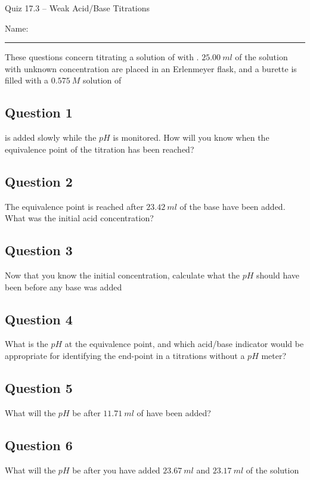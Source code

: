 \documentclass[11pt, letterpaper]{memoir}
\begin{document}
	\begin{center}
		{\large	Quiz 17.3 -- Weak Acid/Base Titrations}
	\end{center}
	{\large Name: \rule[-1mm]{4in}{.1pt} 

	\noindent These questions concern titrating a solution of  with . $25.00~ml$ of the  solution with unknown concentration are placed in an Erlenmeyer flask, and a burette is filled with a $0.575~M$ solution of 
	\subsection*{Question 1}
	 is added slowly while the $pH$ is monitored. How will you know when the equivalence point of the titration has been reached?
	
	\vspace{1em}
	\subsection*{Question 2}
	The equivalence point is reached after $23.42~ml$ of the base have been added. \\What was the initial acid concentration?
	
	\vspace{2em}
	\subsection*{Question 3}
	Now that you know the initial concentration, calculate what the $pH$ should have been before any base was added
	
	\vspace{3em}
	\subsection*{Question 4}
	What is the $pH$ at the equivalence point, and which acid/base indicator would be appropriate for identifying the end-point in a titrations without a $pH$ meter?
	
	\vspace{3em}
	\subsection*{Question 5}
	What will the $pH$ be after $11.71~ml$ of  have been added?	
	
	\vspace{3em}
	\subsection*{Question 6}
	What will the $pH$ be after you have added $23.67~ml$ and $23.17~ml$ of the  solution
	
}
\end{document}
